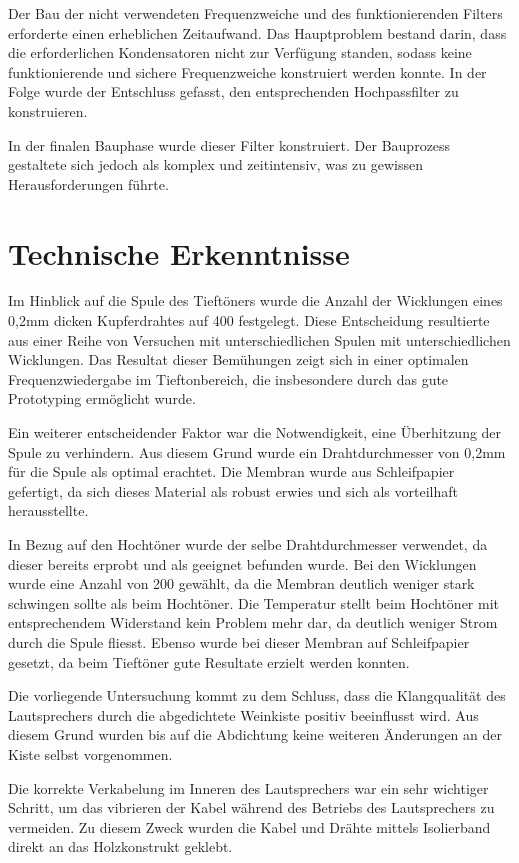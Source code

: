 \documentclass[a4paper,11pt]{report}
\begin{document}
Der Bau der nicht verwendeten Frequenzweiche und des funktionierenden Filters erforderte einen erheblichen Zeitaufwand. Das Hauptproblem bestand darin, dass die erforderlichen Kondensatoren nicht zur Verfügung standen, sodass keine funktionierende und sichere Frequenzweiche konstruiert werden konnte. In der Folge wurde der Entschluss gefasst, den entsprechenden Hochpassfilter zu konstruieren.

In der finalen Bauphase wurde dieser Filter konstruiert. Der Bauprozess gestaltete sich jedoch als komplex und zeitintensiv, was zu gewissen Herausforderungen führte.        

\section{Technische Erkenntnisse}
Im Hinblick auf die Spule des Tieftöners wurde die Anzahl der Wicklungen eines 0,2mm dicken Kupferdrahtes auf 400 festgelegt. Diese Entscheidung resultierte aus einer Reihe von Versuchen mit unterschiedlichen Spulen mit unterschiedlichen Wicklungen. Das Resultat dieser Bemühungen zeigt sich in einer optimalen Frequenzwiedergabe im Tieftonbereich, die insbesondere durch das gute Prototyping ermöglicht wurde.

Ein weiterer entscheidender Faktor war die Notwendigkeit, eine Überhitzung der Spule zu verhindern. Aus diesem Grund wurde ein Drahtdurchmesser von 0,2mm für die Spule als optimal erachtet. Die Membran wurde aus Schleifpapier gefertigt, da sich dieses Material als robust erwies und sich als vorteilhaft herausstellte. 

In Bezug auf den Hochtöner wurde der selbe Drahtdurchmesser verwendet, da dieser bereits erprobt und als geeignet befunden wurde. Bei den Wicklungen wurde eine Anzahl von 200 gewählt, da die Membran deutlich weniger stark schwingen sollte als beim Hochtöner. Die Temperatur stellt beim Hochtöner mit entsprechendem Widerstand kein Problem mehr dar, da deutlich weniger Strom durch die Spule fliesst. Ebenso wurde bei dieser Membran auf Schleifpapier gesetzt, da beim Tieftöner gute Resultate erzielt werden konnten.

Die vorliegende Untersuchung kommt zu dem Schluss, dass die Klangqualität des Lautsprechers durch die abgedichtete Weinkiste positiv beeinflusst wird. Aus diesem Grund wurden bis auf die Abdichtung keine weiteren Änderungen an der Kiste selbst vorgenommen.

Die korrekte Verkabelung im Inneren des Lautsprechers war ein sehr wichtiger Schritt, um das vibrieren der Kabel während des Betriebs des Lautsprechers zu vermeiden. Zu diesem Zweck wurden die Kabel und Drähte mittels Isolierband direkt an das Holzkonstrukt geklebt.
\end{document}
